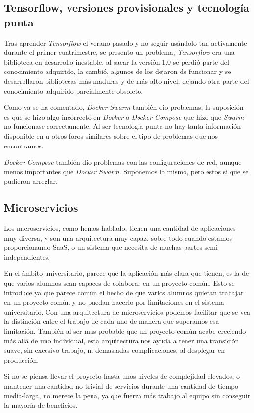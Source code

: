 \subsection{Tensorflow, versiones provisionales y tecnología punta}

Tras aprender \emph{Tensorflow} el verano pasado y no seguir usándolo tan activamente durante el primer cuatrimestre, se presento un problema, \emph{Tensorflow} era una biblioteca en desarrollo inestable, al sacar la versión 1.0 se perdió parte del conocimiento adquirido, la  cambió, algunos de los  dejaron de funcionar y se desarrollaron bibliotecas más maduras y de más alto nivel, dejando otra parte del conocimiento adquirido parcialmente obsoleto.

Como ya se ha comentado, \emph{Docker Swarm} también dio problemas, la suposición es que se hizo algo incorrecto en \emph{Docker} o \emph{Docker Compose} que hizo que \emph{Swarm} no funcionase correctamente. Al ser tecnología punta no hay tanta información disponible en  u otros foros similares sobre el tipo de problemas que nos encontramos.

\emph{Docker Compose} también dio problemas con las configuraciones de red, aunque menos importantes que \emph{Docker Swarm}. Suponemos lo mismo, pero estos sí que se pudieron arreglar.


\subsection{Microservicios}

Los microservicios, como hemos hablado, tienen una cantidad de aplicaciones muy diversa, y son una arquitectura muy capaz, sobre todo cuando estamos proporcionando SaaS, o un sistema que necesita de muchas partes semi independientes. 

En el ámbito universitario, parece que la aplicación más clara que tienen, es la de que varios alumnos sean capaces de colaborar en un proyecto común. Esto se introduce ya que parece común el hecho de que varios alumnos quieran trabajar en un proyecto común y no puedan hacerlo por limitaciones en el sistema universitario. Con una arquitectura de microservicios podemos facilitar que se vea la distinción entre el trabajo de cada uno de manera que superamos esa limitación. También al ser más probable que un proyecto común acabe creciendo más allá de uno individual, esta arquitectura nos ayuda a tener una transición suave, sin excesivo trabajo, ni demasiadas complicaciones, al desplegar en producción.

Si no se piensa llevar el proyecto hasta unos niveles de complejidad elevados, o mantener una cantidad no trivial de servicios durante una cantidad de tiempo media-larga, no merece la pena, ya que fuerza más trabajo al equipo sin conseguir la mayoría de beneficios.